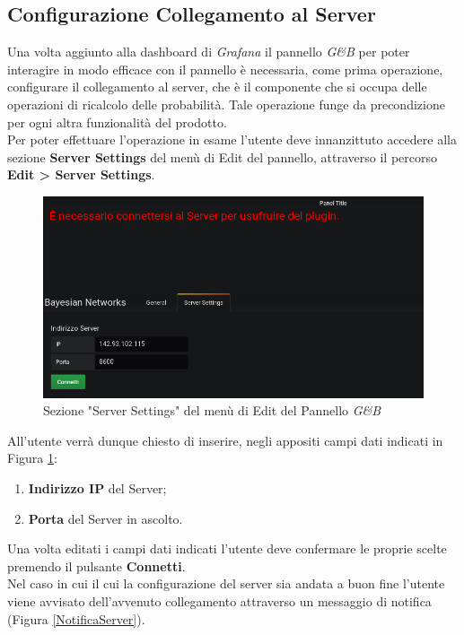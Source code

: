 \subsection{Configurazione Collegamento al Server}\label{CCS}

Una volta aggiunto alla dashboard di \textit{Grafana} il pannello \textit{G\&B} per poter interagire in modo efficace con il pannello è necessaria, come prima operazione, configurare il collegamento al server, che è il componente che si occupa delle operazioni di ricalcolo delle probabilità. Tale operazione funge da precondizione per ogni altra funzionalità del prodotto.\\
Per poter effettuare l'operazione in esame l'utente deve innanzittuto accedere alla sezione \textbf{Server Settings} del menù di Edit del pannello, attraverso il percorso \textbf{Edit > Server Settings}.

\begin{figure}[H]
	\begin{center}
		\includegraphics[scale=0.5]{./images/ServerSettings.png}
		 \caption{Sezione "Server Settings" del menù di Edit del Pannello \textit{G\&B}}	
		 \label{ServerSettings}
	\end{center}
\end{figure}

All'utente verrà dunque chiesto di inserire, negli appositi campi dati indicati in Figura \ref{ServerSettings}:
\begin{enumerate}
	\item \textbf{Indirizzo IP} del Server;
	\item \textbf{Porta} del Server in ascolto.
\end{enumerate}
Una volta editati i campi dati indicati l'utente deve confermare le proprie scelte premendo il pulsante \textbf{Connetti}.\\
Nel caso in cui il cui la configurazione del server sia andata a buon fine l'utente viene avvisato dell'avvenuto collegamento attraverso un messaggio di notifica (Figura \ref{NotificaServer}).

